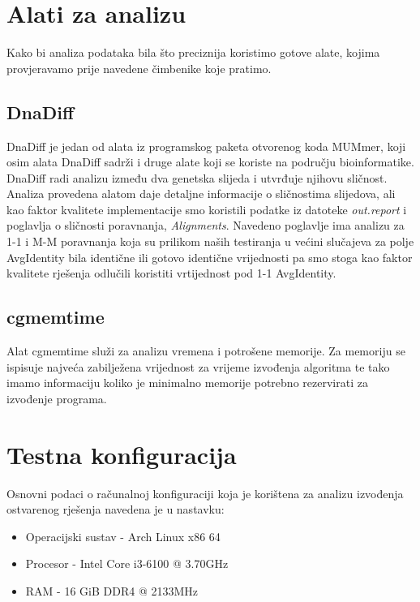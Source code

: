 \documentclass[times, utf8, seminar, numeric]{fer}
\begin{document}
\section{Alati za analizu}
Kako bi analiza podataka bila što preciznija koristimo gotove alate, kojima provjeravamo prije navedene čimbenike koje pratimo.

\subsection{DnaDiff}
DnaDiff je jedan od alata iz programskog paketa otvorenog koda MUMmer, koji osim alata DnaDiff sadrži i druge alate koji se koriste na području bioinformatike. DnaDiff radi analizu između dva genetska slijeda i utvrđuje njihovu sličnost. Analiza provedena alatom daje detaljne informacije o sličnostima slijedova, ali kao faktor kvalitete implementacije smo koristili podatke iz datoteke \emph{out.report} i poglavlja o sličnosti poravnanja, \emph{Alignments}. Navedeno poglavlje ima analizu za 1-1 i M-M poravnanja koja su prilikom naših testiranja u većini slučajeva za polje AvgIdentity bila identične ili gotovo identične vrijednosti pa smo stoga kao faktor kvalitete rješenja odlučili koristiti vrtijednost pod 1-1 AvgIdentity.

\subsection{cgmemtime}
Alat cgmemtime služi za analizu vremena i potrošene memorije. Za memoriju se ispisuje najveća zabilježena vrijednost za vrijeme izvođenja algoritma te tako imamo informaciju koliko je minimalno memorije potrebno rezervirati za izvođenje programa.


\section{Testna konfiguracija}
Osnovni podaci o računalnoj konfiguraciji koja je korištena za analizu izvođenja ostvarenog rješenja navedena je u nastavku:
\renewcommand{\labelitemi}{$\bullet$}
\begin{itemize}
	\item Operacijski sustav - Arch Linux x86 64
	\item Procesor - Intel Core i3-6100 @ 3.70GHz
	\item RAM - 16 GiB DDR4 @ 2133MHz
\end{itemize}
\end{document}
